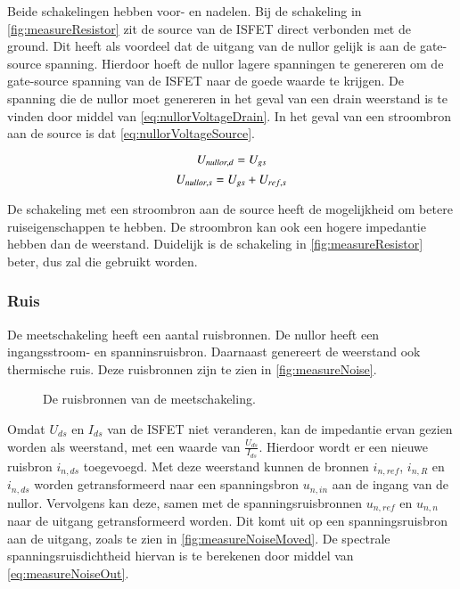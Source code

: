 Beide schakelingen hebben voor- en nadelen.
Bij de schakeling in \autoref{fig:measureResistor} zit de source van de ISFET direct verbonden met de ground. Dit heeft als voordeel dat de uitgang van de nullor gelijk is aan de gate-source spanning. Hierdoor hoeft de nullor lagere spanningen te genereren om de gate-source spanning van de ISFET naar de goede waarde te krijgen. De spanning die de nullor moet genereren in het geval van een drain weerstand is te vinden door middel van \autoref{eq:nullorVoltageDrain}. In het geval van een stroombron aan de source is dat \autoref{eq:nullorVoltageSource}.

\begin{equation}\label{eq:nullorVoltageDrain}
    U_{nullor,d} = U_{gs}
    \tagaddtext{[\si{\volt}]}
\end{equation}
\begin{equation}\label{eq:nullorVoltageSource}
    U_{nullor,s} = U_{gs} + U_{ref,s}
    \tagaddtext{[\si{\volt}]}
\end{equation}

De schakeling met een stroombron aan de source heeft de mogelijkheid om betere ruiseigenschappen te hebben. De stroombron kan ook een hogere impedantie hebben dan de weerstand. Duidelijk is de schakeling in \autoref{fig:measureResistor} beter, dus zal die gebruikt worden.

\subsubsection{Ruis}

De meetschakeling heeft een aantal ruisbronnen. De nullor heeft een ingangsstroom- en spanninsruisbron. Daarnaast genereert de weerstand ook thermische ruis. Deze ruisbronnen zijn te zien in \autoref{fig:measureNoise}.
\begin{figure}[ht]
    \centering
    \def\svgwidth{0.6\textwidth}
    
    \caption{De ruisbronnen van de meetschakeling.}
    \label{fig:measureNoise}
\end{figure}


Omdat $U_{ds}$ en $I_{ds}$ van de ISFET niet veranderen, kan de impedantie ervan gezien worden als weerstand, met een waarde van $\frac{U_{ds}}{I_{ds}}$. Hierdoor wordt er een nieuwe ruisbron $i_{n,ds}$ toegevoegd. Met deze weerstand kunnen de bronnen $i_{n,ref}$, $i_{n,R}$ en $i_{n,ds}$ worden getransformeerd naar een spanningsbron $u_{n,in}$ aan de ingang van de nullor.
Vervolgens kan deze, samen met de spanningsruisbronnen $u_{n,ref}$ en $u_{n,n}$ naar de uitgang getransformeerd worden. Dit komt uit op een spanningsruisbron aan de uitgang, zoals te zien in \autoref{fig:measureNoiseMoved}. De spectrale spanningsruisdichtheid hiervan is te berekenen door middel van \autoref{eq:measureNoiseOut}.


